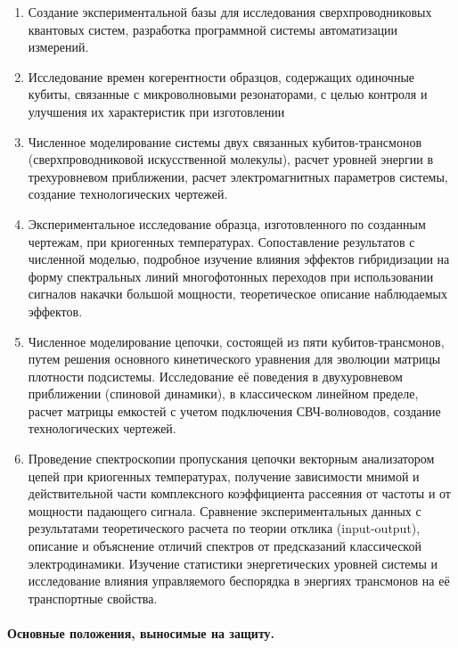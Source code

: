 \documentclass[14pt, a4paper]{extarticle}
\begin{document}
\begin{enumerate}
	\item Создание экспериментальной базы для исследования сверхпроводниковых квантовых систем, разработка программной системы автоматизации измерений.
	\item Исследование времен когерентности образцов, содержащих одиночные кубиты, связанные с микроволновыми резонаторами, с целью контроля и улучшения их характеристик при изготовлении
	\item Численное моделирование системы двух связанных кубитов\hyp трансмонов (сверхпроводниковой искусственной молекулы), расчет уровней энергии в трехуровневом приближении, расчет электромагнитных параметров системы, создание технологических чертежей.
	\item Экспериментальное исследование образца, изготовленного по созданным чертежам, при криогенных температурах. Сопоставление результатов с численной моделью, подробное изучение влияния эффектов гибридизации на форму спектральных линий многофотонных переходов при использовании сигналов накачки большой мощности, теоретическое описание наблюдаемых эффектов.
	\item Численное моделирование цепочки, состоящей из пяти кубитов\hyp трансмонов, путем решения основного кинетического уравнения для эволюции матрицы плотности подсистемы. Исследование её поведения в двухуровневом приближении (спиновой динамики), в классическом линейном пределе, расчет матрицы емкостей с учетом подключения СВЧ-волноводов, создание технологических чертежей.
	\item Проведение спектроскопии пропускания цепочки векторным анализатором цепей при криогенных температурах, получение зависимости мнимой и действительной части комплексного коэффициента рассеяния от частоты и от мощности падающего сигнала. Сравнение экспериментальных данных с результатами теоретического расчета по теории отклика (input\hyp output), описание и объяснение отличий спектров от предсказаний классической электродинамики. Изучение статистики энергетических уровней системы и исследование влияния управляемого беспорядка в энергиях трансмонов на её транспортные свойства.
\end{enumerate}



\paragraph{Основные положения, выносимые на защиту.}
\end{document}
